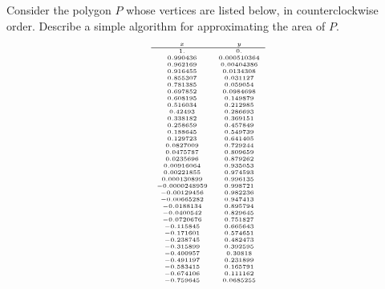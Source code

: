 \documentclass[svgnames]{watsonbook}
\begin{document}
\begin{exercise}{}{}
Consider the polygon $P$ whose vertices are listed below, in counterclockwise order. Describe a simple algorithm for approximating the area of $P$. 
$$ \tiny
\begin{array}{cc}
  x & y \\ \hline 
 1. & 0. \\
 0.990436 & 0.000510364 \\
 0.962169 & 0.00404386 \\
 0.916455 & 0.0134308 \\
 0.855307 & 0.031127 \\
 0.781385 & 0.059054 \\
 0.697852 & 0.0984698 \\
 0.608195 & 0.149879 \\
 0.516034 & 0.212985 \\
 0.42493 & 0.286693 \\
 0.338182 & 0.369151 \\
 0.258659 & 0.457849 \\
 0.188645 & 0.549739 \\
 0.129723 & 0.641405 \\
 0.0827009 & 0.729244 \\
 0.0475787 & 0.809659 \\
 0.0235696 & 0.879262 \\
 0.00916064 & 0.935053 \\
 0.00221855 & 0.974593 \\
 0.000130899 & 0.996135 \\
 -0.0000248959 & 0.998721 \\
 -0.00129456 & 0.982236 \\
 -0.00665282 & 0.947413 \\
 -0.0188134 & 0.895794 \\
 -0.0400542 & 0.829645 \\
 -0.0720676 & 0.751827 \\
 -0.115845 & 0.665643 \\
 -0.171601 & 0.574651 \\
 -0.238745 & 0.482473 \\
 -0.315899 & 0.392595 \\
 -0.400957 & 0.30818 \\
 -0.491197 & 0.231899 \\
 -0.583415 & 0.165791 \\
 -0.674106 & 0.111162 \\
 -0.759645 & 0.0685255 \\

\end{array}$$
\end{exercise}
\end{document}
